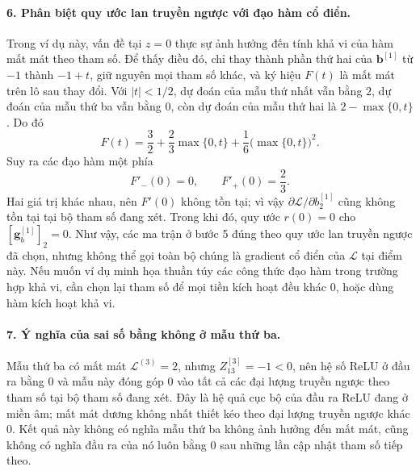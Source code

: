 \paragraph{6. Phân biệt quy ước lan truyền ngược với đạo hàm cổ điển.}
Trong ví dụ này, vấn đề tại $z=0$ thực sự ảnh hưởng đến tính khả vi của hàm mất mát theo tham số. Để thấy điều đó, chỉ thay thành phần thứ hai của $\mathbf{b}^{[1]}$ từ $-1$ thành $-1+t$, giữ nguyên mọi tham số khác, và ký hiệu $F(t)$ là mất mát trên lô sau thay đổi. Với $|t|<1/2$, dự đoán của mẫu thứ nhất vẫn bằng $2$, dự đoán của mẫu thứ ba vẫn bằng $0$, còn dự đoán của mẫu thứ hai là $2-\max\{0,t\}$. Do đó
\begin{equation}
F(t)=\frac{3}{2}+\frac{2}{3}\max\{0,t\}
                  +\frac{1}{6}\bigl(\max\{0,t\}\bigr)^2.
\label{eq:bpb_example_nondifferentiability}
\end{equation}
Suy ra các đạo hàm một phía
\begin{equation}
F'_-(0)=0,\qquad F'_+(0)=\frac{2}{3}.
\label{eq:bpb_example_one_sided}
\end{equation}
Hai giá trị khác nhau, nên $F'(0)$ không tồn tại; vì vậy $\partial\mathcal{L}/\partial b_2^{[1]}$ cũng không tồn tại tại bộ tham số đang xét. Trong khi đó, quy ước $r(0)=0$ cho $[\mathbf{g}_b^{[1]}]_2=0$. Như vậy, các ma trận ở bước 5 đúng theo quy ước lan truyền ngược đã chọn, nhưng không thể gọi toàn bộ chúng là gradient cổ điển của $\mathcal{L}$ tại điểm này. Nếu muốn ví dụ minh họa thuần túy các công thức đạo hàm trong trường hợp khả vi, cần chọn lại tham số để mọi tiền kích hoạt đều khác $0$, hoặc dùng hàm kích hoạt khả vi.

\paragraph{7. Ý nghĩa của sai số bằng không ở mẫu thứ ba.}
Mẫu thứ ba có mất mát $\mathcal{L}^{(3)}=2$, nhưng $Z_{13}^{[3]}=-1<0$, nên hệ số ReLU ở đầu ra bằng $0$ và mẫu này đóng góp $0$ vào tất cả các đại lượng truyền ngược theo tham số tại bộ tham số đang xét. Đây là hệ quả cục bộ của đầu ra ReLU đang ở miền âm; mất mát dương không nhất thiết kéo theo đại lượng truyền ngược khác $0$. Kết quả này không có nghĩa mẫu thứ ba không ảnh hưởng đến mất mát, cũng không có nghĩa đầu ra của nó luôn bằng $0$ sau những lần cập nhật tham số tiếp theo.